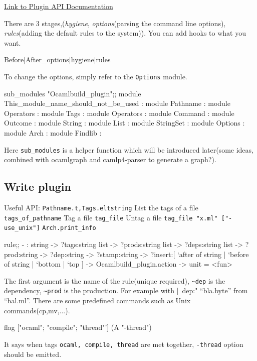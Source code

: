 \href{http://nicolaspouillard.fr/ocamlbuild/html/Signatures.PLUGIN.html}{Link
  to Plugin API Documentation}

There are 3 stages,(\textit{hygiene}, \textit{options}(parsing the
command line options), \textit{rules}(adding the default rules to the
system)). You can add hooks to what you want.

\begin{bashcode}
{Before|After}_{options|hygiene|rules}
\end{bashcode}

To change the options, simply refer to the \verb|Options| module.

\begin{ocamlcode}
sub_modules "Ocamlbuild_plugin";;
module This_module_name_should_not_be_used :
    module Pathname :
        module Operators :
    module Tags :
        module Operators :
    module Command :
    module Outcome :
    module String :
    module List :
    module StringSet :
    module Options :
    module Arch :
    module Findlib :  
\end{ocamlcode}
Here \verb|sub_modules| is a helper function which will be introduced
later(some ideas, combined with ocamlgraph and camlp4-parser to
generate a graph?).  


\subsection{Write plugin}
Useful API: \verb|Pathname.t,Tags.eltstring| List the tags of a file
\verb|tags_of_pathname| Tag a file \verb|tag_file| Untag a file
\verb|tag_file "x.ml" ["-use_unix"]| \verb|Arch.print_info|

\begin{ocamlcode}
rule;;
- : string ->
    ?tags:string list ->
    ?prods:string list ->
    ?deps:string list ->
    ?prod:string ->
    ?dep:string ->
    ?stamp:string ->
    ?insert:[ `after of string | `before of string | `bottom | `top ] ->
    Ocamlbuild_plugin.action -> unit
= <fun>
\end{ocamlcode}
The first argument is the name of the rule(unique required),
\verb|~dep| is the dependency, \verb|~prod| is the production. For
example with |~dep:"%
``bla.byte'' from ``bal.ml''. There are some predefined commands such
as Unix commands(cp,mv,...).


\begin{ocamlcode}
flag ["ocaml"; "compile"; "thread"'] (A "-thread")  
\end{ocamlcode}
It says when tags \verb|ocaml, compile, thread| are met together,
\verb|-thread| option should be emitted.

